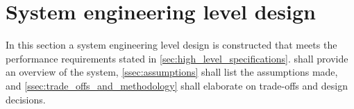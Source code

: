 \section{System engineering level design} 
\label{sec:system_engineering_level_design}
In this section a system engineering level design is constructed that meets the performance requirements stated in \cref{sec:high_level_specifications}.  shall provide an overview of the system, \cref{ssec:assumptions} shall list the assumptions made, and \cref{ssec:trade_offs_and_methodology} shall elaborate on trade-offs and design decisions. 



\clearpage


\clearpage

